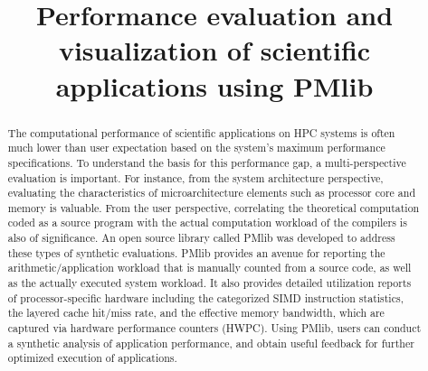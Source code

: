 \documentclass[conference]{IEEEtran}
\begin{document}
\title{
%
%
Performance evaluation and visualization of scientific applications using PMlib
}

\author{
\and
{}
\and
{}
}

\maketitle

\begin{abstract}
The computational performance of scientific applications on HPC systems
is often much lower than user expectation based on the system's maximum
performance specifications.
To understand the basis for this performance gap, a multi-perspective
evaluation is important.
For instance, from the system architecture perspective,
evaluating the characteristics of microarchitecture elements such as
processor core and memory is valuable.
From the user perspective, correlating the theoretical computation coded
as a source program with the actual computation workload of the compilers
is also of significance.
An open source library called PMlib was developed to address these types
of synthetic evaluations.
PMlib provides an avenue for reporting the arithmetic/application workload
that is manually counted from a source code,
as well as the actually executed system workload.
It also provides detailed utilization reports of processor-specific hardware
including the categorized SIMD instruction statistics, the layered cache
hit/miss rate, and the effective memory bandwidth,
which are captured via hardware performance counters (HWPC).
Using PMlib, users can conduct a synthetic analysis of application
performance, and obtain useful feedback for further optimized execution
of applications.
\end{abstract}
\end{document}
